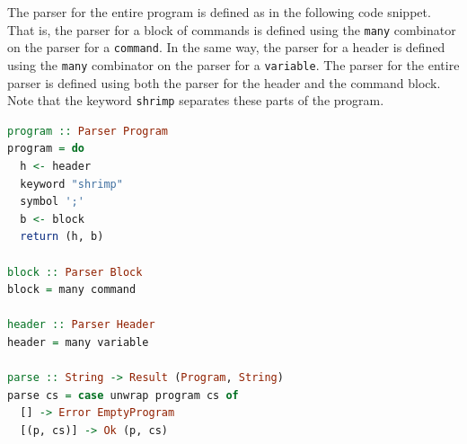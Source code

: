 \documentclass[12pt,a4paper]{article}
\begin{document}
The parser for the entire program is defined as in the following code snippet.
That is, the parser for a block of commands is defined using the \texttt{many} combinator on the parser for a \texttt{command}.
In the same way, the parser for a header is defined using the \texttt{many} combinator on the parser for a \texttt{variable}.
The parser for the entire parser is defined using both the parser for the header and the command block.
Note that the keyword \texttt{shrimp} separates these parts of the program.
\begin{lstlisting}[language=Haskell, style=custom-style]
program :: Parser Program
program = do
  h <- header
  keyword "shrimp"
  symbol ';'
  b <- block
  return (h, b)

block :: Parser Block
block = many command

header :: Parser Header
header = many variable

parse :: String -> Result (Program, String)
parse cs = case unwrap program cs of
  [] -> Error EmptyProgram
  [(p, cs)] -> Ok (p, cs)
\end{lstlisting}
\end{document}
